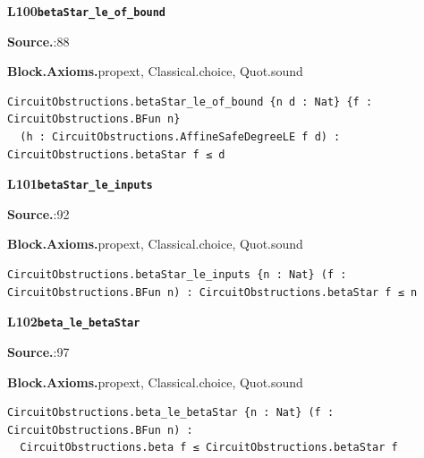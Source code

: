 \par\medskip\noindent\begin{minipage}{\textwidth}
{\small\bfseries L100\enspace\texttt{betaStar\_le\_of\_bound}\par}
{\footnotesize\raggedright\textbf{Source.}\enspace{}:88\par
\textbf{Block.}\quad\textbf{Axioms.}\enspace propext, Classical.choice, Quot.sound\par}\nopagebreak
\begin{lstlisting}
CircuitObstructions.betaStar_le_of_bound {n d : Nat} {f : CircuitObstructions.BFun n}
  (h : CircuitObstructions.AffineSafeDegreeLE f d) : CircuitObstructions.betaStar f ≤ d
\end{lstlisting}
\end{minipage}\par

\par\medskip\noindent\begin{minipage}{\textwidth}
{\small\bfseries L101\enspace\texttt{betaStar\_le\_inputs}\par}
{\footnotesize\raggedright\textbf{Source.}\enspace{}:92\par
\textbf{Block.}\quad\textbf{Axioms.}\enspace propext, Classical.choice, Quot.sound\par}\nopagebreak
\begin{lstlisting}
CircuitObstructions.betaStar_le_inputs {n : Nat} (f : CircuitObstructions.BFun n) : CircuitObstructions.betaStar f ≤ n
\end{lstlisting}
\end{minipage}\par

\par\medskip\noindent\begin{minipage}{\textwidth}
{\small\bfseries L102\enspace\texttt{beta\_le\_betaStar}\par}
{\footnotesize\raggedright\textbf{Source.}\enspace{}:97\par
\textbf{Block.}\quad\textbf{Axioms.}\enspace propext, Classical.choice, Quot.sound\par}\nopagebreak
\begin{lstlisting}
CircuitObstructions.beta_le_betaStar {n : Nat} (f : CircuitObstructions.BFun n) :
  CircuitObstructions.beta f ≤ CircuitObstructions.betaStar f
\end{lstlisting}
\end{minipage}\par

